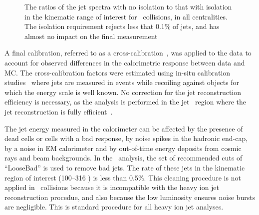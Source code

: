 \begin{figure}
\caption{The ratios of the jet spectra with no isolation to that with isolation in the kinematic range of interest for \pbpb\ collisions, in all centralities. The isolation requirement rejects less that 0.1\% of jets, and has almost no impact on the final measurement}
\label{fig:ISO}
\end{figure}  




A final calibration, referred to as a cross-calibration~\cite{cc2015}, 
was applied to the data to account for observed differences in the calorimetric response between data and MC. The cross-calibration factors were estimated using in-situ calibration studies~\cite{HIjesnote} where jets are measured in events while recoiling against objects for which the energy scale is well known. 
No correction for the jet reconstruction efficiency is necessary, as the analysis is performed in the jet \pT\ region where the jet reconstruction is fully efficient~\cite{ATLAS-COM-PHYS-2013-1369}. 

The jet energy measured in the calorimeter can be affected by the presence 
of dead cells or cells with a bad response, by noise spikes in the hadronic end-cap, by a noise in EM calorimeter and by out-of-time energy deposits from cosmic rays and beam backgrounds. In the \pp\ analysis, the set of recommended cuts of ``LooseBad'' is used to remove bad jets. The rate of these jets in the kinematic region of interest (100--316 \GeV) is less than 0.5\%. This cleaning procedure is not applied in \PbPb\ collisions because it is incompatible with the heavy ion jet reconstruction procedue, and also because the low luminosity ensures noise bursts are negligible. This is standard procedure for all heavy ion jet analyses.
 

